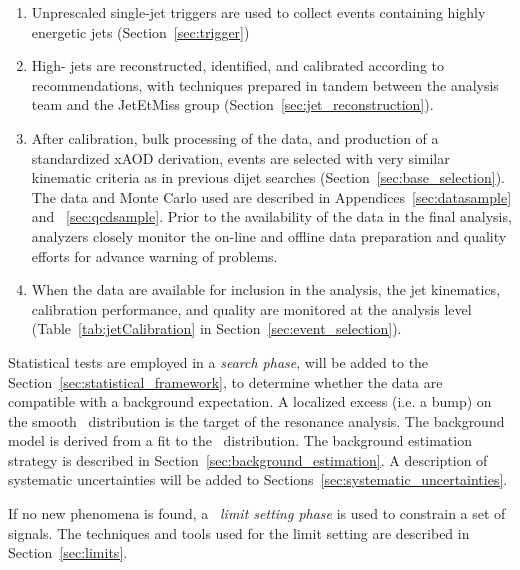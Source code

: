 \begin{enumerate}
\item Unprescaled single-jet triggers are used to collect events containing
highly energetic jets (Section~\ref{sec:trigger})
\item High-\pT\xspace jets are reconstructed, identified, and calibrated according to recommendations, with techniques
prepared in tandem between the analysis team and the
JetEtMiss group (Section~\ref{sec:jet_reconstruction}).
\item After calibration, bulk processing of the data, and production of a standardized xAOD derivation, events are selected with very similar kinematic 
criteria as in previous dijet searches (Section~\ref{sec:base_selection}). The data and Monte Carlo used are described in
Appendices~\ref{sec:datasample} and ~\ref{sec:qcdsample}. Prior to the availability of the data in the final
analysis, analyzers closely monitor the on-line and offline data preparation and
quality efforts for advance warning of problems.%
\item When the data are available for inclusion in the analysis, the jet kinematics, calibration performance, 
and quality are monitored at the analysis level (Table~\ref{tab:jetCalibration} in Section~\ref{sec:event_selection}).
\end{enumerate}

Statistical tests are employed in a
\textit{search phase}, will be added to the Section~\ref{sec:statistical_framework}, to determine whether the 
data are compatible with a background expectation. 
A localized excess (i.e. a bump) on the smooth \mjj\  distribution
is the target of the resonance analysis.
The background model is derived from a fit to the \mjj\ distribution.
The background estimation strategy is described in Section~\ref{sec:background_estimation}.
A description of systematic uncertainties will be added to 
Sections~\ref{sec:systematic_uncertainties}. 

If no new phenomena is found, a ~\textit{limit setting phase} is used
to constrain a set of signals. 
The techniques and tools used for the limit setting are described in
Section~\ref{sec:limits}. 

